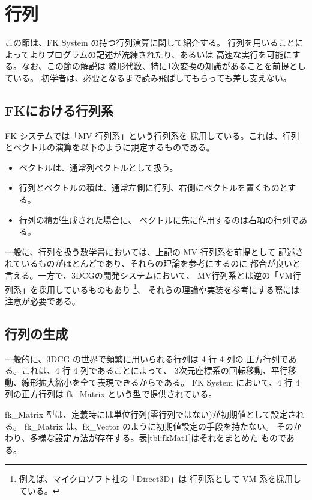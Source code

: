 \section{行列}
この節は、FK System の持つ行列演算に関して紹介する。
行列を用いることによってよりプログラムの記述が洗練されたり、あるいは
高速な実行を可能にする。なお、この節の解説は
線形代数、特に1次変換の知識があることを前提としている。
初学者は、必要となるまで読み飛ばしてもらっても差し支えない。

\subsection{FKにおける行列系}
FK システムでは「MV 行列系」という行列系を
採用している。これは、行列とベクトルの演算を以下のように規定するものである。
\begin{itemize}
 \item ベクトルは、通常列ベクトルとして扱う。
 \item 行列とベクトルの積は、通常左側に行列、右側にベクトルを置くものとする。
 \item 行列の積が生成された場合に、
	ベクトルに先に作用するのは右項の行列である。
\end{itemize}
一般に、行列を扱う数学書においては、上記の MV 行列系を前提として
記述されているものがほとんどであり、それらの理論を参考にするのに
都合が良いと言える。一方で、3DCGの開発システムにおいて、
MV行列系とは逆の「VM行列系」を採用しているものもあり
\footnote{例えば、マイクロソフト社の「Direct3D」は
行列系として VM 系を採用している。}、
それらの理論や実装を参考にする際には注意が必要である。

\subsection{行列の生成}
一般的に、3DCG の世界で頻繁に用いられる行列は 4 行 4 列の
正方行列である。これは、4 行 4 列であることによって、
3次元座標系の回転移動、平行移動、線形拡大縮小を全て表現できるからである。
FK System において、4 行 4 列の正方行列は fk\_Matrix という型で提供されている。

fk\_Matrix 型は、定義時には単位行列(零行列ではない)が初期値として設定される。
fk\_Matrix は、fk\_Vector のように初期値設定の手段を持たない。
そのかわり、多様な設定方法が存在する。表\ref{tbl:fkMat1}はそれをまとめた
ものである。

